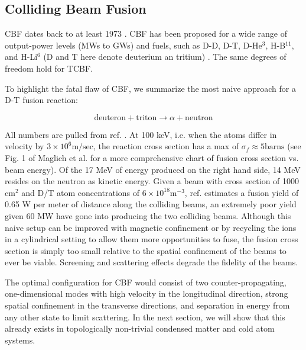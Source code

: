 \documentclass[onecolumn,
               superscriptaddress,
               floatfix,
               longbibliography, 
               showkeys,apl]{revtex4-2}
\begin{document}
\subsection{Colliding Beam Fusion}\label{sec:CBF}

CBF dates back to at least 1973 \cite{MAGLICH1973213}. CBF has been proposed for a wide range of output-power levels (MWs to GWs) and fuels, such as D-D, D-T, D-He$^3$, H-B$^11$, and H-Li$^6$ (D and T here denote deuterium an tritium) \cite{doi:10.1063/1.1649593, doi:10.1063/1.1475683}. The same degrees of freedom hold for TCBF.

To highlight the fatal flaw of CBF, we summarize the most naive approach for a D-T fusion reaction: 

\begin{equation}
    \textrm{deuteron} + \textrm{triton} \rightarrow \alpha + \textrm{neutron}
\label{eq:fusionreaction}
\end{equation}

All numbers are pulled from ref. \cite{blewett197xcbf}. At 100 keV, i.e. when the atoms differ in velocity by $3\times10^6\textrm{m/sec}$, the reaction cross section has a max of $\sigma_f \approx 5 \textrm{barns}$ (see Fig. 1 of Maglich et al. \cite{MAGLICH1975IEEE} for a more comprehensive chart of fusion cross section vs. beam energy). Of the 17 MeV of energy produced on the right hand side, 14 MeV resides on the neutron as kinetic energy. Given a beam with cross section of 1000 cm$^2$ and D/T atom concentrations of $6\times10^{18} \textrm{m}^{-3}$, ref. \cite{blewett197xcbf} estimates a fusion yield of 0.65 W per meter of distance along the colliding beams, an extremely poor yield given 60 MW have gone into producing the two colliding beams. Although this naive setup can be improved with magnetic confinement or by recycling the ions in a cylindrical setting to allow them more opportunities to fuse, the fusion cross section is simply too small relative to the spatial confinement of the beams to ever be viable. Screening and scattering effects degrade the fidelity of the beams.

The optimal configuration for CBF would consist of two counter-propagating, one-dimensional modes with high velocity in the longitudinal direction, strong spatial confinement in the transverse directions, and separation in energy from any other state to limit scattering. In the next section, we will show that this already exists in topologically non-trivial condensed matter and cold atom systems.
\end{document}
